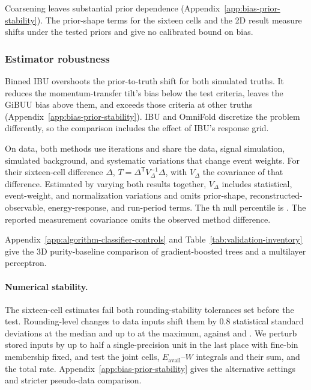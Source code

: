 \label{sec:gbdt-model-dependence}
Coarsening leaves substantial prior dependence (Appendix~\ref{app:bias-prior-stability}). The prior-shape terms for the sixteen cells and the 2D result measure shifts under the tested priors and give no calibrated bound on bias.

\subsubsection{Estimator robustness}

Binned IBU overshoots the prior-to-truth shift for both simulated truths. It reduces the momentum-transfer tilt's bias below the test criteria, leaves the GiBUU bias above them, and exceeds those criteria at other truths (Appendix~\ref{app:bias-prior-stability}). IBU and OmniFold discretize the problem differently, so the comparison includes the effect of IBU's response grid.

\label{sec:fived16-ibu}
On data, both methods use  iterations and share the data, signal simulation, simulated background, and systematic variations that change event weights. For their sixteen-cell difference $\Delta$, $T=\Delta^{\mathsf T}V_\Delta^{-1}\Delta$, with $V_\Delta$ the covariance of that difference. Estimated by varying both results together, $V_\Delta$ includes statistical, event-weight, and normalization variations and omits prior-shape, reconstructed-observable, energy-response, and run-period terms. The th null percentile is . The reported measurement covariance omits the observed method difference.

\label{sec:3d-classifier}
Appendix~\ref{app:algorithm-classifier-controls} and Table~\ref{tab:validation-inventory} give the 3D purity-baseline comparison of gradient-boosted trees and a multilayer perceptron.

\paragraph{Numerical stability.} \label{sec:higher-dimensional-calibration}
\label{sec:5d}

The sixteen-cell estimates fail both rounding-stability tolerances set before the test. Rounding-level changes to data inputs shift them by 0.8 statistical standard deviations at the median and up to  at the maximum, against  and . We perturb stored inputs by up to half a single-precision unit in the last place with fine-bin membership fixed, and test the joint cells, $E_{\mathrm{avail}}$--$W$ integrals and their sum, and the total rate. Appendix~\ref{app:bias-prior-stability} gives the alternative settings and stricter pseudo-data comparison.

